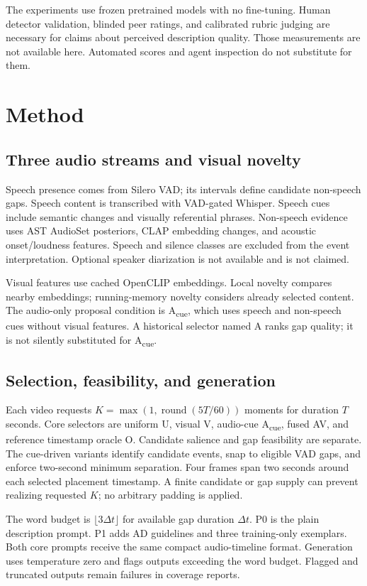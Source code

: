 \documentclass[10pt,twocolumn]{article}
\newcommand{\Acue}{A\textsubscript{cue}}
\begin{document}
The experiments use frozen pretrained models with no fine-tuning. Human detector validation, blinded peer ratings, and calibrated rubric judging are necessary for claims about perceived description quality. Those measurements are not available here. Automated scores and agent inspection do not substitute for them.

\section{Method}
\subsection{Three audio streams and visual novelty}
Speech presence comes from Silero VAD; its intervals define candidate non-speech gaps. Speech content is transcribed with VAD-gated Whisper. Speech cues include semantic changes and visually referential phrases. Non-speech evidence uses AST AudioSet posteriors, CLAP embedding changes, and acoustic onset/loudness features. Speech and silence classes are excluded from the event interpretation. Optional speaker diarization is not available and is not claimed.

Visual features use cached OpenCLIP embeddings. Local novelty compares nearby embeddings; running-memory novelty considers already selected content. The audio-only proposal condition is \Acue{}, which uses speech and non-speech cues without visual features. A historical selector named A ranks gap quality; it is not silently substituted for \Acue{}.

\subsection{Selection, feasibility, and generation}
Each video requests $K=\max(1,\operatorname{round}(5T/60))$ moments for duration $T$ seconds. Core selectors are uniform U, visual V, audio-cue \Acue{}, fused AV, and reference timestamp oracle O. Candidate salience and gap feasibility are separate. The cue-driven variants identify candidate events, snap to eligible VAD gaps, and enforce two-second minimum separation. Four frames span two seconds around each selected placement timestamp. A finite candidate or gap supply can prevent realizing requested $K$; no arbitrary padding is applied.

The word budget is $\lfloor3\Delta t\rfloor$ for available gap duration $\Delta t$. P0 is the plain description prompt. P1 adds AD guidelines and three training-only exemplars. Both core prompts receive the same compact audio-timeline format. Generation uses temperature zero and flags outputs exceeding the word budget. Flagged and truncated outputs remain failures in coverage reports.
\end{document}
